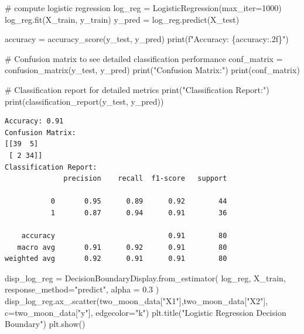 \documentclass[
  letterpaper,
  DIV=11,
  numbers=noendperiod]{scrartcl}
\newenvironment{Shaded}{\begin{snugshade}}{\end{snugshade}}
\newcommand{\BuiltInTok}[1]{\textcolor[rgb]{0.00,0.23,0.31}{#1}}
\newcommand{\CommentTok}[1]{\textcolor[rgb]{0.37,0.37,0.37}{#1}}
\newcommand{\DecValTok}[1]{\textcolor[rgb]{0.68,0.00,0.00}{#1}}
\newcommand{\FloatTok}[1]{\textcolor[rgb]{0.68,0.00,0.00}{#1}}
\newcommand{\NormalTok}[1]{\textcolor[rgb]{0.00,0.23,0.31}{#1}}
\newcommand{\OperatorTok}[1]{\textcolor[rgb]{0.37,0.37,0.37}{#1}}
\newcommand{\SpecialCharTok}[1]{\textcolor[rgb]{0.37,0.37,0.37}{#1}}
\newcommand{\SpecialStringTok}[1]{\textcolor[rgb]{0.13,0.47,0.30}{#1}}
\newcommand{\StringTok}[1]{\textcolor[rgb]{0.13,0.47,0.30}{#1}}
\begin{document}
\begin{Shaded}
\begin{Highlighting}[]
\CommentTok{\# compute logistic regression}
\NormalTok{log\_reg }\OperatorTok{=}\NormalTok{ LogisticRegression(max\_iter}\OperatorTok{=}\DecValTok{1000}\NormalTok{)}
\NormalTok{log\_reg.fit(X\_train, y\_train)}
\NormalTok{y\_pred }\OperatorTok{=}\NormalTok{ log\_reg.predict(X\_test)}

\NormalTok{accuracy }\OperatorTok{=}\NormalTok{ accuracy\_score(y\_test, y\_pred)}
\BuiltInTok{print}\NormalTok{(}\SpecialStringTok{f"Accuracy: }\SpecialCharTok{\{}\NormalTok{accuracy}\SpecialCharTok{:.2f\}}\SpecialStringTok{"}\NormalTok{)}

\CommentTok{\# Confusion matrix to see detailed classification performance}
\NormalTok{conf\_matrix }\OperatorTok{=}\NormalTok{ confusion\_matrix(y\_test, y\_pred)}
\BuiltInTok{print}\NormalTok{(}\StringTok{"Confusion Matrix:"}\NormalTok{)}
\BuiltInTok{print}\NormalTok{(conf\_matrix)}

\CommentTok{\# Classification report for detailed metrics}
\BuiltInTok{print}\NormalTok{(}\StringTok{"Classification Report:"}\NormalTok{)}
\BuiltInTok{print}\NormalTok{(classification\_report(y\_test, y\_pred))}
\end{Highlighting}
\end{Shaded}

\begin{verbatim}
Accuracy: 0.91
Confusion Matrix:
[[39  5]
 [ 2 34]]
Classification Report:
              precision    recall  f1-score   support

           0       0.95      0.89      0.92        44
           1       0.87      0.94      0.91        36

    accuracy                           0.91        80
   macro avg       0.91      0.92      0.91        80
weighted avg       0.92      0.91      0.91        80
\end{verbatim}

\begin{Shaded}
\begin{Highlighting}[]
\NormalTok{disp\_log\_reg }\OperatorTok{=}\NormalTok{ DecisionBoundaryDisplay.from\_estimator(}
\NormalTok{    log\_reg,}
\NormalTok{    X\_train,}
\NormalTok{    response\_method}\OperatorTok{=}\StringTok{"predict"}\NormalTok{,}
\NormalTok{    alpha }\OperatorTok{=} \FloatTok{0.3}
\NormalTok{)}
\NormalTok{disp\_log\_reg.ax\_.scatter(two\_moon\_data[}\StringTok{"X1"}\NormalTok{],two\_moon\_data[}\StringTok{"X2"}\NormalTok{], c}\OperatorTok{=}\NormalTok{two\_moon\_data[}\StringTok{"y"}\NormalTok{], edgecolor}\OperatorTok{=}\StringTok{"k"}\NormalTok{)}
\NormalTok{plt.title(}\StringTok{"Logistic Regression Decision Boundary"}\NormalTok{)}
\NormalTok{plt.show()}
\end{Highlighting}
\end{Shaded}
\end{document}
